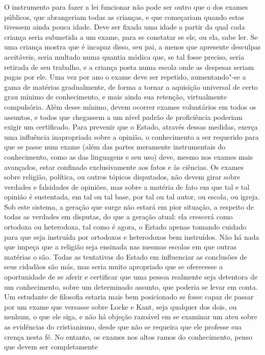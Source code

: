 O instrumento para fazer a lei funcionar não pode ser outro que o dos
exames públicos, que abrangeriam todas as crianças, e que começariam
quando estas tivessem ainda pouca idade. Deve ser fixada uma idade a
partir da qual cada criança seria submetida a um exame, para se
constatar se ele, ou ela, sabe ler. Se uma criança mostra que é incapaz
disso, seu pai, a menos que apresente desculpas aceitáveis, seria
multado numa quantia módica que, se tal fosse preciso, seria retirada
de seu trabalho, e a criança posta numa escola onde as despesas seriam
pagas por ele. Uma vez por ano o exame deve ser repetido,
aumentando"-se a gama de matérias gradualmente, de forma a tornar a
aquisição universal de certo grau mínimo de conhecimento, e mais ainda
sua retenção, virtualmente compulsória. Além desse mínimo, devem
ocorrer exames voluntários em todos os assuntos, e todos que chegassem
a um nível padrão de proficiência poderiam exigir um certificado. Para
prevenir que o Estado, através dessas medidas, exerça uma influência
inapropriada sobre a opinião, o conhecimento a ser requerido para que
se passe num exame (além das partes meramente instrumentais do
conhecimento, como as das linguagens e seu uso) deve, mesmo nos exames
mais avançados, estar confinado exclusivamente aos fatos e às ciências.
Os exames sobre religião, política, ou outros tópicos disputados, não
devem girar sobre verdades e falsidades de opiniões, mas sobre a  matéria
de fato em que tal e tal opinião é sustentada, em tal ou tal
base, por tal ou tal autor, ou escola, ou igreja. Sob este sistema, a
geração que surge não estará em pior situação, a respeito de todas as
verdades em disputas, do que a geração atual: ela crescerá como
ortodoxa ou heterodoxa, tal como é agora, o Estado apenas tomando
cuidado para que seja instruída por ortodoxos e heterodoxos bem
instruídos. Não há nada que impeça que a religião seja ensinada nas
mesmas escolas em que outras matérias o são. Todas as tentativas do
Estado em influenciar as conclusões de seus cidadãos são más, mas seria
muito apropriado que se oferecesse a oportunidade de se aferir e
certificar que uma pessoa realmente seja detentora de um conhecimento,
sobre um determinado assunto, que poderia se levar em conta. Um
estudante de filosofia estaria mais bem posicionado se fosse capaz de
passar por um exame que versasse sobre Locke e Kant, seja qualquer dos
dois, ou nenhum, o que ele siga, e não há objeção razoável em se
examinar um ateu sobre as evidências do cristianismo, desde que não se
requeira que ele professe sua crença nesta fé. No entanto, os exames
nos altos ramos do conhecimento, penso que devem ser completamente
